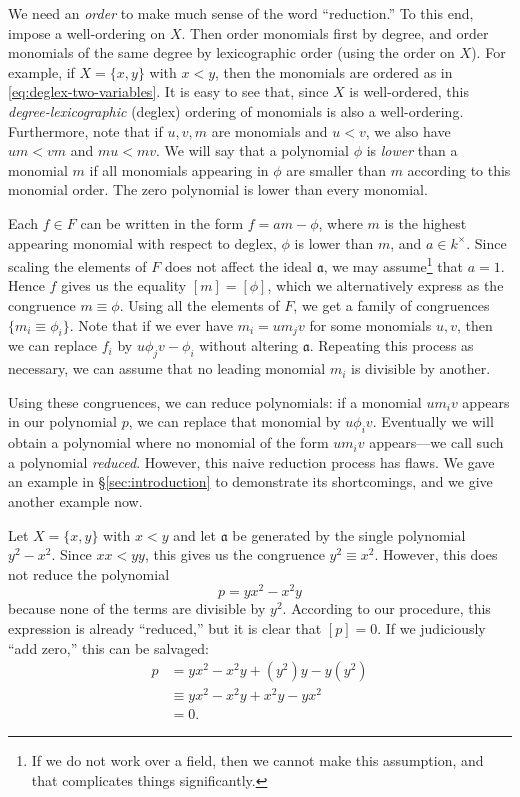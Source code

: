We need an \emph{order} to make much sense of the word ``reduction.'' To this end, impose a well-ordering on $X$. Then order monomials first by degree, and order monomials of the same degree by lexicographic order (using the order on $X$). For example, if $X = \{x,y\}$ with $x < y$, then the monomials are ordered as in \eqref{eq:deglex-two-variables}.
It is easy to see that, since $X$ is well-ordered, this \emph{degree-lexicographic} (deglex) ordering of monomials is also a well-ordering. Furthermore, note that if $u,v,m$ are monomials and $u < v$, we also have $um < vm$ and $mu < mv$. We will say that a polynomial $\phi$ is \emph{lower} than a monomial $m$ if all monomials appearing in $\phi$ are smaller than $m$ according to this monomial order. The zero polynomial is lower than every monomial.

Each $f \in F$ can be written in the form $f = am - \phi$, where $m$ is the highest appearing monomial with respect to deglex, $\phi$ is lower than $m$, and $a \in k^\times$. Since scaling the elements of $F$ does not affect the ideal $\mathfrak{a}$, we may assume\footnote{If we do not work over a field, then we cannot make this assumption, and that complicates things significantly.} that $a = 1$. Hence $f$ gives us the equality $[m] = [\phi]$, which we alternatively express as the congruence $m \equiv \phi$. Using all the elements of $F$, we get a family of congruences $\{ m_i \equiv \phi_i \}$. Note that if we ever have $m_i = um_jv$ for some monomials $u,v$, then we can replace $f_i$ by $u\phi_j v - \phi_i$ without altering $\mathfrak{a}$. Repeating this process as necessary, we can assume that no leading monomial $m_i$ is divisible by another.

Using these congruences, we can reduce polynomials: if a monomial $u m_i v$ appears in our polynomial $p$, we can replace that monomial by $u \phi_i v$. Eventually we will obtain a polynomial where no monomial of the form $u m_i v$ appears---we call such a polynomial \emph{reduced}. However, this naive reduction process has flaws. We gave an example in \S\ref{sec:introduction} to demonstrate its shortcomings, and we give another example now.

\begin{example}\label{exa:x2-y2}
	Let $X=\{x,y\}$ with $x < y$ and let $\mathfrak{a}$ be generated by the single polynomial $y^2 - x^2$. Since $xx < yy$, this gives us the congruence $y^2 \equiv x^2$. However, this does not reduce the polynomial
	\[
		p = yx^2 - x^2 y
	\]
	because none of the terms are divisible by $y^2$. According to our procedure, this expression is already ``reduced,'' but it is clear that $[p]=0$. If we judiciously ``add zero,'' this can be salvaged:
	\begin{align*}
		p &= yx^2 - x^2 y + (y^2)y - y(y^2)\\
		&\equiv yx^2 - x^2 y + x^2 y - y x^2\\
		&= 0.
	\end{align*}
\end{example}

